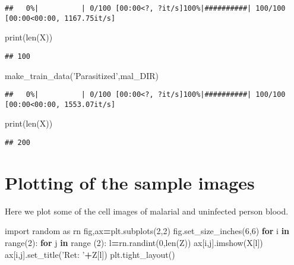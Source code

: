 \documentclass[]{book}
\newenvironment{Shaded}{\begin{snugshade}}{\end{snugshade}}
\newcommand{\BuiltInTok}[1]{#1}
\newcommand{\ControlFlowTok}[1]{\textcolor[rgb]{0.13,0.29,0.53}{\textbf{#1}}}
\newcommand{\DecValTok}[1]{\textcolor[rgb]{0.00,0.00,0.81}{#1}}
\newcommand{\ImportTok}[1]{#1}
\newcommand{\KeywordTok}[1]{\textcolor[rgb]{0.13,0.29,0.53}{\textbf{#1}}}
\newcommand{\NormalTok}[1]{#1}
\newcommand{\OperatorTok}[1]{\textcolor[rgb]{0.81,0.36,0.00}{\textbf{#1}}}
\newcommand{\StringTok}[1]{\textcolor[rgb]{0.31,0.60,0.02}{#1}}
\begin{document}
\begin{verbatim}
##   0%|          | 0/100 [00:00<?, ?it/s]100%|##########| 100/100 [00:00<00:00, 1167.75it/s]
\end{verbatim}

\begin{Shaded}
\begin{Highlighting}[]
\BuiltInTok{print}\NormalTok{(}\BuiltInTok{len}\NormalTok{(X))}
\end{Highlighting}
\end{Shaded}

\begin{verbatim}
## 100
\end{verbatim}

\begin{Shaded}
\begin{Highlighting}[]
\NormalTok{make_train_data(}\StringTok{'Parasitized'}\NormalTok{,mal_DIR)}
\end{Highlighting}
\end{Shaded}

\begin{verbatim}
##   0%|          | 0/100 [00:00<?, ?it/s]100%|##########| 100/100 [00:00<00:00, 1553.07it/s]
\end{verbatim}

\begin{Shaded}
\begin{Highlighting}[]
\BuiltInTok{print}\NormalTok{(}\BuiltInTok{len}\NormalTok{(X))}
\end{Highlighting}
\end{Shaded}

\begin{verbatim}
## 200
\end{verbatim}

\hypertarget{plotting-of-the-sample-images}{%
\section{Plotting of the sample images}\label{plotting-of-the-sample-images}}

Here we plot some of the cell images of malarial and uninfected person blood.

\begin{Shaded}
\begin{Highlighting}[]
\ImportTok{import}\NormalTok{ random }\ImportTok{as}\NormalTok{ rn}
\NormalTok{fig,ax}\OperatorTok{=}\NormalTok{plt.subplots(}\DecValTok{2}\NormalTok{,}\DecValTok{2}\NormalTok{)}
\NormalTok{fig.set_size_inches(}\DecValTok{6}\NormalTok{,}\DecValTok{6}\NormalTok{)}
\ControlFlowTok{for}\NormalTok{ i }\KeywordTok{in} \BuiltInTok{range}\NormalTok{(}\DecValTok{2}\NormalTok{):}
    \ControlFlowTok{for}\NormalTok{ j }\KeywordTok{in} \BuiltInTok{range}\NormalTok{ (}\DecValTok{2}\NormalTok{):}
\NormalTok{        l}\OperatorTok{=}\NormalTok{rn.randint(}\DecValTok{0}\NormalTok{,}\BuiltInTok{len}\NormalTok{(Z))}
\NormalTok{        ax[i,j].imshow(X[l])}
\NormalTok{        ax[i,j].set_title(}\StringTok{'Ret: '}\OperatorTok{+}\NormalTok{Z[l])}
\NormalTok{        plt.tight_layout()}
        
\end{Highlighting}
\end{Shaded}
\end{document}
